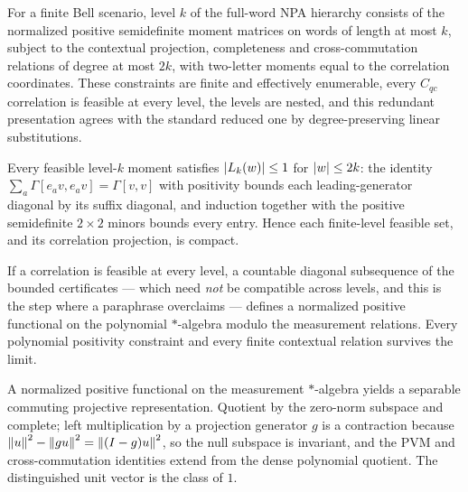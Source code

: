 \begin{lemma}
\label{lem:npa-levels}
For a finite Bell scenario, level $k$ of the full-word NPA hierarchy consists of the normalized
positive semidefinite moment matrices on words of length at most $k$, subject to the
contextual projection, completeness and cross-commutation relations of degree at most $2k$,
with two-letter moments equal to the correlation coordinates. These constraints are finite and
effectively enumerable, every $C_{qc}$ correlation is feasible at every level, the levels are
nested, and this redundant presentation agrees with the standard reduced one by
degree-preserving linear substitutions.
\end{lemma}

\begin{lemma}
\label{lem:npa-moment-bound}
Every feasible level-$k$ moment satisfies $\left\vert {L_k(w)} \right\vert \leq 1$ for $\left\vert {w} \right\vert \leq 2k$: the
identity $\sum_a \Gamma[e_a v, e_a v] = \Gamma[v,v]$ with positivity bounds each
leading-generator diagonal by its suffix diagonal, and induction together with the positive
semidefinite $2 \times 2$ minors bounds every entry. Hence each finite-level feasible set, and
its correlation projection, is compact.
\end{lemma}

\begin{lemma}
\label{lem:npa-diagonal}
If a correlation is feasible at every level, a countable diagonal subsequence of the bounded
certificates --- which need \emph{not} be compatible across levels, and this is the step where
a paraphrase overclaims --- defines a normalized positive functional on the polynomial
$*$-algebra modulo the measurement relations. Every polynomial positivity constraint and every
finite contextual relation survives the limit.
\end{lemma}

\begin{lemma}
\label{lem:npa-gns}
A normalized positive functional on the measurement $*$-algebra yields a separable commuting
projective representation. Quotient by the zero-norm subspace and complete; left multiplication
by a projection generator $g$ is a contraction because
$\left\| {u} \right\|^2 - \left\| {gu} \right\|^2 = \left\| {(I - g)u} \right\|^2$, so the null subspace is invariant, and the
PVM and cross-commutation identities extend from the dense polynomial quotient. The
distinguished unit vector is the class of $1$.
\end{lemma}

